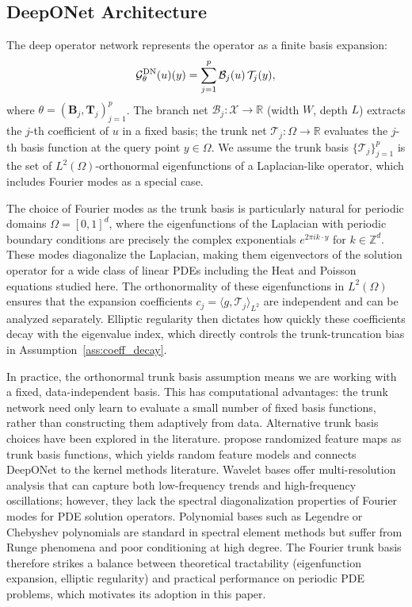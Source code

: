 \documentclass[12pt,a4paper]{article}
\def\reals{{\mathbb R}}
\begin{document}
\subsection{DeepONet Architecture}

The deep operator network represents the operator as a finite basis expansion:
\begin{equation}
    \mathcal{G}_\theta^{\rm DN}(u)(y)
    = \sum_{j=1}^p \mathcal{B}_j(u)\,\mathcal{T}_j(y),
    \label{eq:deeponet_def}
\end{equation}
where $\theta = (\mathbf{B}_j, \mathbf{T}_j)_{j=1}^p$.
The branch net $\mathcal{B}_j: \mathcal{X} \to \reals$ (width $W$, depth $L$)
extracts the $j$-th coefficient of $u$ in a fixed basis;
the trunk net $\mathcal{T}_j: \Omega \to \reals$ evaluates the $j$-th basis
function at the query point $y \in \Omega$.
We assume the trunk basis $\{\mathcal{T}_j\}_{j=1}^p$ is the set of
$L^2(\Omega)$-orthonormal eigenfunctions of a Laplacian-like operator,
which includes Fourier modes as a special case.

The choice of Fourier modes as the trunk basis is particularly natural for
periodic domains $\Omega = [0,1]^d$, where the eigenfunctions of the Laplacian
with periodic boundary conditions are precisely the complex exponentials
$e^{2\pi i k \cdot y}$ for $k \in \mathbb{Z}^d$.  These modes diagonalize the
Laplacian, making them eigenvectors of the solution operator for a wide class
of linear PDEs including the Heat and Poisson equations studied here.  The
orthonormality of these eigenfunctions in $L^2(\Omega)$ ensures that the
expansion coefficients $c_j = \langle g, \mathcal{T}_j \rangle_{L^2}$ are
independent and can be analyzed separately.  Elliptic regularity then dictates
how quickly these coefficients decay with the eigenvalue index, which directly
controls the trunk-truncation bias in Assumption~\ref{ass:coeff_decay}.

In practice, the orthonormal trunk basis assumption means we are working with
a fixed, data-independent basis.  This has computational advantages: the trunk
network need only learn to evaluate a small number of fixed basis functions,
rather than constructing them adaptively from data.  Alternative trunk basis
choices have been explored in the literature.  \citet{nelsen2024rfm} propose
randomized feature maps as trunk basis functions, which yields random feature
models and connects DeepONet to the kernel methods literature.
Wavelet bases \citep{kutyniok2022nn} offer multi-resolution analysis that can
capture both low-frequency trends and high-frequency oscillations; however,
they lack the spectral diagonalization properties of Fourier modes for PDE
solution operators.  Polynomial bases such as Legendre or Chebyshev polynomials
are standard in spectral element methods but suffer from Runge phenomena and
poor conditioning at high degree.  The Fourier trunk basis therefore strikes a
balance between theoretical tractability (eigenfunction expansion, elliptic
regularity) and practical performance on periodic PDE problems, which motivates
its adoption in this paper.
\end{document}
